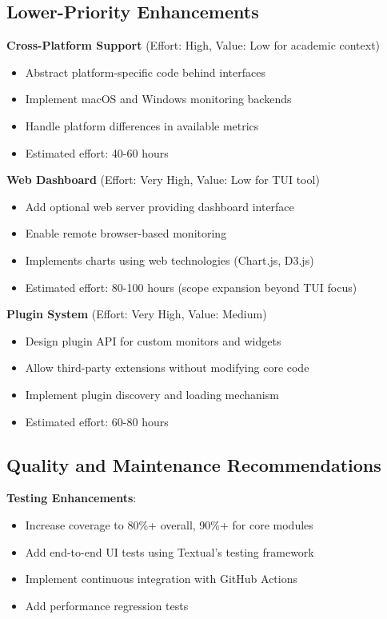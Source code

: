 \documentclass[12pt,a4paper,oneside]{report}
\begin{document}
\subsection{Lower-Priority Enhancements}

\textbf{Cross-Platform Support} (Effort: High, Value: Low for academic context)
\begin{itemize}
    \item Abstract platform-specific code behind interfaces
    \item Implement macOS and Windows monitoring backends
    \item Handle platform differences in available metrics
    \item Estimated effort: 40-60 hours
\end{itemize}

\textbf{Web Dashboard} (Effort: Very High, Value: Low for TUI tool)
\begin{itemize}
    \item Add optional web server providing dashboard interface
    \item Enable remote browser-based monitoring
    \item Implements charts using web technologies (Chart.js, D3.js)
    \item Estimated effort: 80-100 hours (scope expansion beyond TUI focus)
\end{itemize}

\textbf{Plugin System} (Effort: Very High, Value: Medium)
\begin{itemize}
    \item Design plugin API for custom monitors and widgets
    \item Allow third-party extensions without modifying core code
    \item Implement plugin discovery and loading mechanism
    \item Estimated effort: 60-80 hours
\end{itemize}

\subsection{Quality and Maintenance Recommendations}

\textbf{Testing Enhancements}:
\begin{itemize}
    \item Increase coverage to 80\%+ overall, 90\%+ for core modules
    \item Add end-to-end UI tests using Textual's testing framework
    \item Implement continuous integration with GitHub Actions
    \item Add performance regression tests
\end{itemize}
\end{document}
